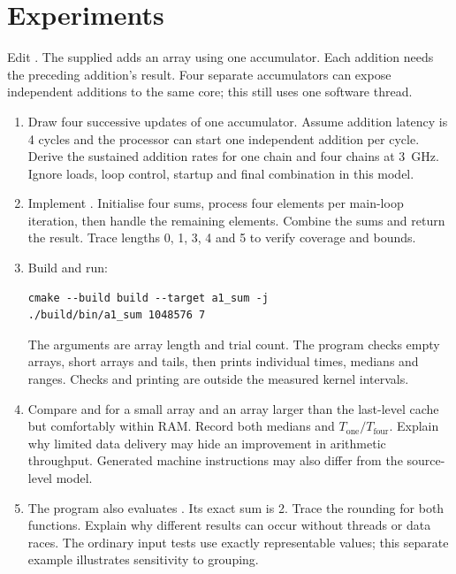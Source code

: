 \section{Experiments}
Edit . The supplied  adds an array using one
accumulator. Each addition needs the preceding addition's result. Four separate
accumulators can expose independent additions to the same core; this still uses
one software thread.
\begin{enumerate}
\item Draw four successive updates of one accumulator. Assume addition latency
is 4 cycles and the processor can start one independent addition per cycle.
Derive the sustained addition rates for one chain and four chains at 3~GHz.
Ignore loads, loop control, startup and final combination in this model.
\item Implement . Initialise four sums, process four elements
per main-loop iteration, then handle the remaining elements. Combine the sums
and return the result. Trace lengths 0, 1, 3, 4 and 5 to verify coverage and bounds.
\item Build and run:
\begin{lstlisting}[style=shell]
cmake --build build --target a1_sum -j
./build/bin/a1_sum 1048576 7
\end{lstlisting}
The arguments are array length and trial count. The program checks empty arrays,
short arrays and tails, then prints individual times, medians and ranges.
Checks and printing are outside the measured kernel intervals.
\item Compare  and  for a small array and an array larger
than the last-level cache but comfortably within RAM. Record both medians and
$T_{\mathrm{one}}/T_{\mathrm{four}}$. Explain why limited data delivery may hide
an improvement in arithmetic throughput. Generated machine instructions may also
differ from the source-level model.
\item The program also evaluates . Its exact sum is 2.
Trace the rounding for both functions. Explain why different results can occur
without threads or data races. The ordinary input tests use exactly representable
values; this separate example illustrates sensitivity to grouping.
\end{enumerate}

